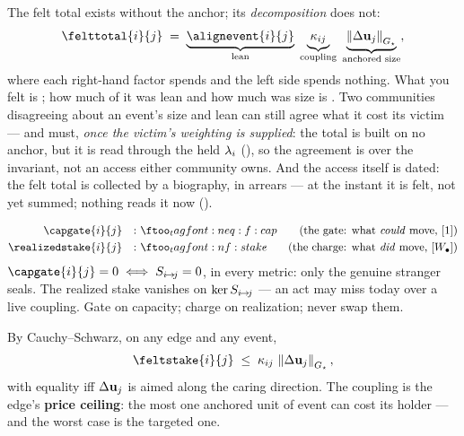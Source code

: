 \documentclass[../main]{subfiles}
\begin{document}
\begin{theorem}
  The felt total exists without the anchor; its \emph{decomposition} does not:
  \begin{equation}
    \felttotal{i}{j}
      \;=\;\underbrace{\alignevent{i}{j}}_{\text{lean}}\;
           \underbrace{\coupling{i}{j}}_{\text{coupling}}\;
           \underbrace{\normGvec{\outcomechange{j}}}_{\text{anchored size}},
    \label{eq:f:split}
  \end{equation}
  where each right-hand factor spends  and the left side spends nothing.
  What you felt is ; how much of it was lean and how much was size is
  . Two communities disagreeing about an event's size and lean can
  still agree what it cost its victim --- and must, \emph{once the victim's weighting is
  supplied}: the total is built on no anchor, but it is read through the held
  $\lambda\sb{i}$ (), so the agreement is over the invariant, not an
  access either community owns. And the access itself is dated: the felt total is
  collected by a biography, in arrears --- at the instant it is felt, not yet summed;
  nothing reads it now ().
\end{theorem}


\begin{definition}
  \begin{align}
    \capgate{i}{j} & &:& \eqtag{eq:f:cap}{the gate: what \emph{could} move, $\dimratio$}\\
    \realizedstake{i}{j} & &:& \eqtag{f:stake}{the charge: what \emph{did} move, $\dimwelfare$}
  \end{align}
  $\capgate{i}{j}=0\iff\comov{i}{j}=0$, in every metric: only the genuine stranger seals.
  The realized stake vanishes on $\ker S\sb{ i\!\to\!j }$ --- an act may miss today over a live
  coupling. Gate on capacity; charge on realization; never swap them.
\end{definition}

\begin{proposition}
  By Cauchy--Schwarz, on any edge and any event,
  \begin{equation}
    \feltstake{i}{j}\;\le\;\coupling{i}{j}\,\normGvec{\outcomechange{j}},
    \label{eq:f:ceiling}
  \end{equation}
  with equality iff $\Delta\mathbf{u}\sb{j}$ is aimed along the caring direction. The coupling
  is the edge's \textbf{price ceiling}: the most one anchored unit of event can cost its
  holder --- and the worst case is the targeted one.
\end{proposition}
\end{document}
